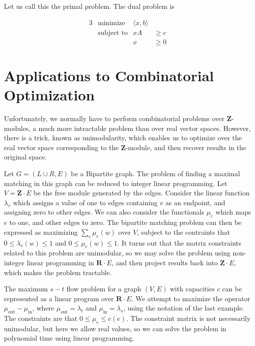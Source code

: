     Let us call this the primal problem. The dual problem is

    \begin{alignat*}{3}
        &\text{minimize }   & \langle x, b \rangle &\\
        &\text{subject to}  & xA &\geq c\\
        &                   & x  &\geq 0
    \end{alignat*}

\chapter{Applications to Combinatorial Optimization}

Unfortunately, we normally have to perform combinatorial problems over $\mathbf{Z}$-modules, a much more intractable problem than over real vector spaces. However, there is a trick, known as unimodularity, which enables us to optimize over the real vector space corresponding to the $\mathbf{Z}$-module, and then recover results in the original space.

\begin{example}
    Let $G = (L \cup R, E)$ be a Bipartite graph. The problem of finding a maximal matching in this graph can be reduced to integer linear programming. Let $V = \mathbf{Z} \cdot E$ be the free module generated by the edges. Consider the linear function $\lambda_v$ which assigns a value of one to edges containing $v$ as an endpoint, and assigning zero to other edges. We can also consider the functionals $\mu_e$ which maps $e$ to one, and other edges to zero. The bipartite matching problem can then be expressed as maximizing $\sum_e \mu_e(w)$ over $V$, subject to the contraints that $0 \leq \lambda_v(w) \leq 1$ and $0 \leq \mu_e(w) \leq 1$. It turns out that the matrix constraints related to this problem are unimodular, so we may solve the problem using non-integer linear programming in $\mathbf{R} \cdot E$, and then project results back into $\mathbf{Z} \cdot E$, which makes the problem tractable.
\end{example}

\begin{example}
    The maximum $s-t$ flow problem for a graph $(V,E)$ with capacities $c$ can be represented as a linear program over $\mathbf{R} \cdot E$. We attempt to maximize the operator $\mu_{\text{out}} - \mu_{\text{in}}$, where $\mu_{\text{out}} = \lambda_t$ and $\mu_{\text{in}} = \lambda_s$, using the notation of the last example. The constraints are that $0 \leq \mu_e \leq c(e)$. The constraint matrix is not necessarily unimodular, but here we allow real values, so we can solve the problem in polynomial time using linear programming.
\end{example}

